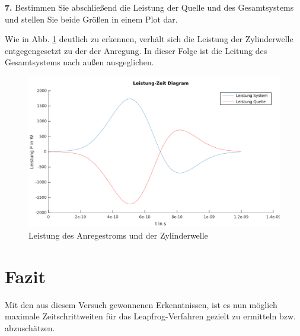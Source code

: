 \documentclass[Protokollheft.tex]{subfiles}
\begin{document}
\begin{framed}
	\noindent \textbf{7.} Bestimmen Sie abschließend die Leistung der Quelle und des Gesamtsystems und stellen Sie beide Größen in einem Plot dar.\label{exer:powerPlot}
\end{framed}
\noindent
 Wie in Abb. \ref{fig:leistung} deutlich zu erkennen, verhält sich die Leistung der Zylinderwelle entgegengesetzt zu der der Anregung. In dieser Folge ist die Leitung des Gesamtsystems nach außen ausgeglichen. 
\begin{figure}[h]
	\centering
	\includegraphics[width=0.7\linewidth]{Leistung}
	\caption{Leistung des Anregestroms und der Zylinderwelle}
	\label{fig:leistung}
\end{figure}





\section{Fazit}
Mit den aus diesem Versuch gewonnenen Erkenntnissen, ist es nun möglich maximale Zeitschrittweiten für das Leapfrog-Verfahren gezielt zu ermitteln bzw. abzuschätzen.
\end{document}
